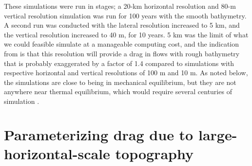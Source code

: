 \documentclass[twocol]{ametsocV5}
\newcommand{\tempS}[1]{}
\newcommand{\twowidth}[0]{4in}
\begin{document}
These simulations were run in stages; a 20-km horizontal resolution and 80-m vertical resolution simulation was run for 100 years with the smooth bathymetry.  A second run was conducted with the lateral resolution increased to 5 km, and the vertical resolution increased to 40 m, for 10 years. 5 km was the limit of what we could feasible simulate at a manageable computing cost, and the indication from \citet{klymak18} is that this resolution will provide a drag in flows with rough bathymetry that is probably exaggerated by a factor of 1.4 compared to simulations with respective horizontal and vertical resolutions of 100 m and 10 m.
As noted below, the simulations are close to being in mechanical equilibrium, but they are not anywhere near thermal equilibrium, which would require several centuries of simulation \citep[i.e.][run similar simulations for 620 years]{Munday_2015}.

\section{Parameterizing drag due to large-horizontal-scale topography}
\label{sec:ResultsSingleFlow}


\end{document}
